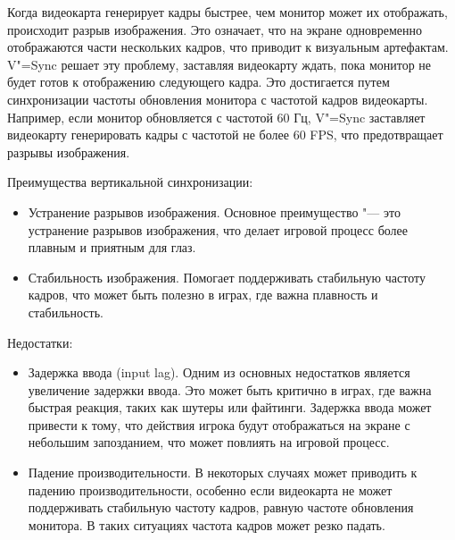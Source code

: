 Когда видеокарта генерирует кадры быстрее, чем монитор может их отображать, происходит разрыв изображения. Это означает, что на экране одновременно отображаются части нескольких кадров, что приводит к визуальным артефактам. V"=Sync решает эту проблему, заставляя видеокарту ждать, пока монитор не будет готов к отображению следующего кадра. Это достигается путем синхронизации частоты обновления монитора с частотой кадров видеокарты. Например, если монитор обновляется с частотой 60 Гц, V"=Sync заставляет видеокарту генерировать кадры с частотой не более 60 FPS, что предотвращает разрывы изображения.

Преимущества вертикальной синхронизации:
\begin{itemize}
    \item Устранение разрывов изображения. Основное преимущество "--- это устранение разрывов изображения, что делает игровой процесс более плавным и приятным для глаз.
    \item Стабильность изображения. Помогает поддерживать стабильную частоту кадров, что может быть полезно в играх, где важна плавность и стабильность.
\end{itemize}

Недостатки:
\begin{itemize}
    \item Задержка ввода (input lag). Одним из основных недостатков является увеличение задержки ввода. Это может быть критично в играх, где важна быстрая реакция, таких как шутеры или файтинги. Задержка ввода может привести к тому, что действия игрока будут отображаться на экране с небольшим запозданием, что может повлиять на игровой процесс.
    \item Падение производительности. В некоторых случаях может приводить к падению производительности, особенно если видеокарта не может поддерживать стабильную частоту кадров, равную частоте обновления монитора. В таких ситуациях частота кадров может резко падать.
\end{itemize}